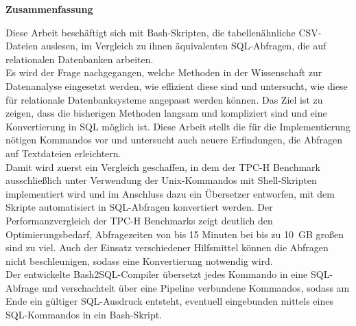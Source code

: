 

\clearemptydoublepage






\vspace*{2cm}
\begin{center}
{\Large \bf Zusammenfassung}
\end{center}
\vspace{1cm}
Diese Arbeit beschäftigt sich mit Bash-Skripten, die tabellenähnliche CSV-Dateien auslesen, im Vergleich zu ihnen äquivalenten SQL-Abfragen, die auf relationalen Datenbanken arbeiten.\\
Es wird der Frage nachgegangen, welche Methoden in der Wissenschaft zur Datenanalyse eingesetzt werden, wie effizient diese sind und untersucht, wie diese für relationale Datenbanksysteme angepasst werden können. Das Ziel ist zu zeigen, dass die bisherigen Methoden langsam und kompliziert sind und eine Konvertierung in SQL möglich ist.
Diese Arbeit stellt die für die Implementierung nötigen Kommandos vor und untersucht auch neuere Erfindungen, die Abfragen auf Textdateien erleichtern.\\
Damit wird zuerst ein Vergleich geschaffen, in dem der TPC-H Benchmark ausschließlich unter Verwendung der Unix-Kommandos mit Shell-Skripten implementiert wird und im Anschluss dazu ein Übersetzer entworfen, mit dem Skripte automatisiert in SQL-Abfragen konvertiert werden.
Der Performanzvergleich der TPC-H Benchmarks zeigt deutlich den Optimierungsbedarf, Abfragezeiten von bis 15 Minuten bei bis zu 10\ GB großen sind zu viel. Auch der Einsatz verschiedener Hilfsmittel können die Abfragen nicht beschleunigen, sodass eine Konvertierung notwendig wird.\\
Der entwickelte Bash2SQL-Compiler übersetzt jedes Kommando in eine SQL-Abfrage und verschachtelt über eine Pipeline verbundene Kommandos, sodass am Ende ein gültiger SQL-Ausdruck entsteht, eventuell eingebunden mittels eines SQL-Kommandos in ein Bash-Skript.


